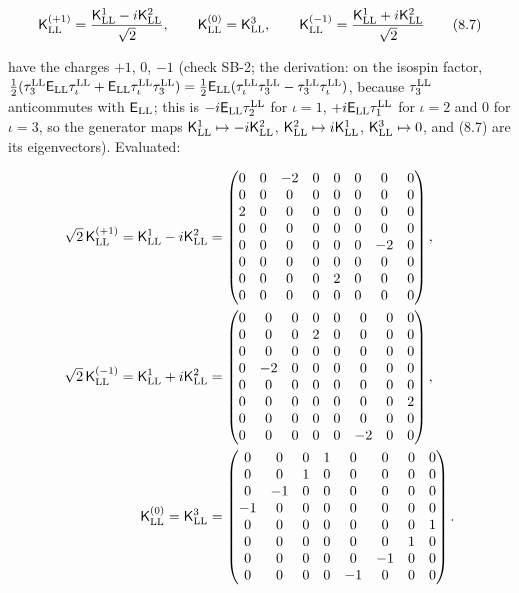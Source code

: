 \documentclass[
  10pt,
]{article}
\begin{document}
\[\mathsf K^{(+1)}_{\rm LL}=\frac{\mathsf K^1_{\rm LL}-i\mathsf K^2_{\rm LL}}{\sqrt2},\qquad\mathsf K^{(0)}_{\rm LL}=\mathsf K^3_{\rm LL},\qquad\mathsf K^{(-1)}_{\rm LL}=\frac{\mathsf K^1_{\rm LL}+i\mathsf K^2_{\rm LL}}{\sqrt2}\tag{8.7}\]

have the charges \(+1\), \(0\), \(-1\) (check SB-2; the derivation: on
the isospin factor,
\(\tfrac12(\tau^{\rm LL}_3\mathsf E_{\rm LL}\tau^{\rm LL}_\iota+\mathsf E_{\rm LL}\tau^{\rm LL}_\iota\tau^{\rm LL}_3)=\tfrac12\mathsf E_{\rm LL}(\tau^{\rm LL}_\iota\tau^{\rm LL}_3-\tau^{\rm LL}_3\tau^{\rm LL}_\iota)\),
because \(\tau^{\rm LL}_3\) anticommutes with \(\mathsf E_{\rm LL}\);
this is \(-i\mathsf E_{\rm LL}\tau^{\rm LL}_2\) for \(\iota=1\),
\(+i\mathsf E_{\rm LL}\tau^{\rm LL}_1\) for \(\iota=2\) and 0 for
\(\iota=3\), so the generator maps
\(\mathsf K^1_{\rm LL}\mapsto-i\mathsf K^2_{\rm LL}\),
\(\mathsf K^2_{\rm LL}\mapsto i\mathsf K^1_{\rm LL}\),
\(\mathsf K^3_{\rm LL}\mapsto0\), and (8.7) are its eigenvectors).
Evaluated:

\[\begin{aligned}\sqrt2\,\mathsf K^{(+1)}_{\rm LL}=\mathsf K^1_{\rm LL}-i\mathsf K^2_{\rm LL}&=\begin{pmatrix}0&0&-2&0&0&0&0&0\\0&0&0&0&0&0&0&0\\2&0&0&0&0&0&0&0\\0&0&0&0&0&0&0&0\\0&0&0&0&0&0&-2&0\\0&0&0&0&0&0&0&0\\0&0&0&0&2&0&0&0\\0&0&0&0&0&0&0&0\end{pmatrix},\\ \sqrt2\,\mathsf K^{(-1)}_{\rm LL}=\mathsf K^1_{\rm LL}+i\mathsf K^2_{\rm LL}&=\begin{pmatrix}0&0&0&0&0&0&0&0\\0&0&0&2&0&0&0&0\\0&0&0&0&0&0&0&0\\0&-2&0&0&0&0&0&0\\0&0&0&0&0&0&0&0\\0&0&0&0&0&0&0&2\\0&0&0&0&0&0&0&0\\0&0&0&0&0&-2&0&0\end{pmatrix},\\ \mathsf K^{(0)}_{\rm LL}=\mathsf K^3_{\rm LL}&=\begin{pmatrix}0&0&0&1&0&0&0&0\\0&0&1&0&0&0&0&0\\0&-1&0&0&0&0&0&0\\-1&0&0&0&0&0&0&0\\0&0&0&0&0&0&0&1\\0&0&0&0&0&0&1&0\\0&0&0&0&0&-1&0&0\\0&0&0&0&-1&0&0&0\end{pmatrix}.\end{aligned}\]
\end{document}
